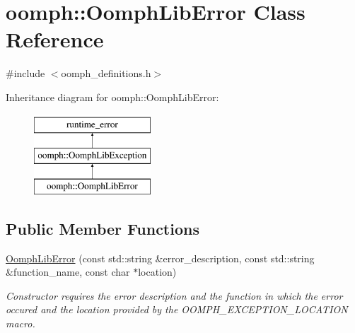 \hypertarget{classoomph_1_1OomphLibError}{}\section{oomph\+:\+:Oomph\+Lib\+Error Class Reference}
\label{classoomph_1_1OomphLibError}


{\ttfamily \#include $<$oomph\+\_\+definitions.\+h$>$}

Inheritance diagram for oomph\+:\+:Oomph\+Lib\+Error\+:\begin{figure}[H]
\begin{center}
\leavevmode
\includegraphics[height=3.000000cm]{classoomph_1_1OomphLibError}
\end{center}
\end{figure}
\subsection*{Public Member Functions}
\begin{DoxyCompactItemize}
\item 
\hyperlink{classoomph_1_1OomphLibError_a2706846fffe8d60e13918daec455e780}{Oomph\+Lib\+Error} (const std\+::string \&error\+\_\+description, const std\+::string \&function\+\_\+name, const char $\ast$location)
\begin{DoxyCompactList}\small\item\em Constructor requires the error description and the function in which the error occured and the location provided by the O\+O\+M\+P\+H\+\_\+\+E\+X\+C\+E\+P\+T\+I\+O\+N\+\_\+\+L\+O\+C\+A\+T\+I\+ON macro. \end{DoxyCompactList}\end{DoxyCompactItemize}
